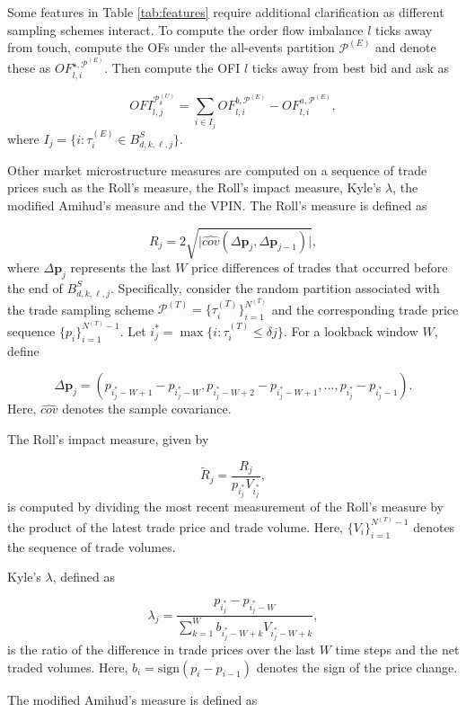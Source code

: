 \documentclass[10pt,a4paper,oneside]{article}
\begin{document}
Some features in Table \ref{tab:features} require additional clarification as different sampling schemes interact. To compute the order flow imbalance $l$ ticks away from touch, compute the OFs under the all-events partition $\mathcal{P}^{(E)}$ and denote these as $OF^{\star, \mathcal{P}^{(E)}}_{l,i}$. Then compute the OFI $l$ ticks away from best bid and ask as

$$
    OFI^{\mathcal{P}^{(U)}_{\delta}}_{l, j} = \sum_{i \in I_j} OF^{b, \mathcal{P}^{(E)}}_{l,i} - OF^{a, \mathcal{P}^{(E)}}_{l,i},
$$
where $I_j = \{ i : \tau^{(E)}_i \in B^S_{d,k,\ell,j} \}$.

Other market microstructure measures are computed on a sequence of trade prices such as the Roll's measure, the Roll's impact measure, Kyle's $\lambda$, the modified Amihud's measure and the VPIN. The Roll’s measure is defined as

\[
    R_j = 2 \sqrt{\Big| \hat{cov}(\Delta \mathbf{p}_j, \Delta \mathbf{p}_{j - 1}) \Big|},
\]
where \(\Delta \mathbf{p}_j\) represents the last \(W\) price differences of trades that occurred before the end of $B^S_{d,k,\ell,j}$. Specifically, consider the random partition associated with the trade sampling scheme \(\mathcal{P}^{(T)} = \{ \tau^{(T)}_i \}_{i=1}^{N^{(T)}}\) and the corresponding trade price sequence \(\{p_i\}_{i=1}^{N^{(T)}-1}\). Let \(i^*_j = \max\{i : \tau^{(T)}_i \leq \delta j\}\). For a lookback window \(W\), define

\[
    \Delta \mathbf{p}_j = (p_{i^*_j - W + 1} - p_{i^*_j - W}, p_{i^*_j - W + 2} - p_{i^*_j - W + 1}, \dots, p_{i^*_j} - p_{i^*_j - 1}).
\]
Here, \(\hat{cov}\) denotes the sample covariance.

The Roll’s impact measure, given by

\[
    \tilde{R}_j = \frac{R_j}{p_{i^*_j} V_{i^*_j}},
\]
is computed by dividing the most recent measurement of the Roll’s measure by the product of the latest trade price and trade volume. Here, \(\{ V_i \}_{i=1}^{N^{(T)}-1}\) denotes the sequence of trade volumes.

Kyle’s \(\lambda\), defined as

\[
    \lambda_j = \frac{p_{i^*_j} - p_{i^*_j - W}}{\sum_{k=1}^W b_{i^*_j - W + k} V_{i^*_j - W + k}},
\]
is the ratio of the difference in trade prices over the last \(W\) time steps and the net traded volumes. Here, \(b_i = \text{sign}(p_i - p_{i-1})\) denotes the sign of the price change.

The modified Amihud’s measure is defined as
\end{document}
